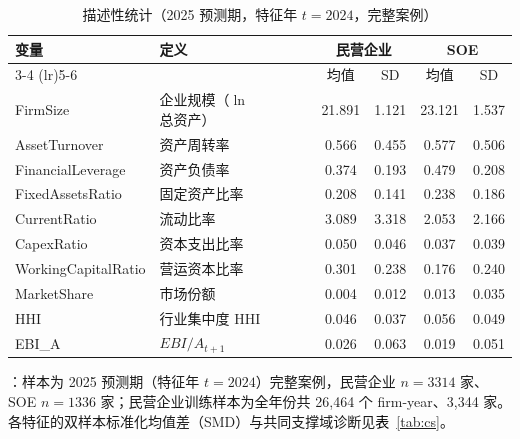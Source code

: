 \begin{table}[t]
\centering
\caption{描述性统计（2025 预测期，特征年 $t=2024$，完整案例）}
\label{tab:descriptives}
\small
\begin{tabular}{llcccc}
\toprule
变量 & 定义 & \multicolumn{2}{c}{民营企业} & \multicolumn{2}{c}{SOE} \\
\cmidrule(lr){3-4} \cmidrule(lr){5-6}
& & 均值 & SD & 均值 & SD \\
\midrule
FirmSize & 企业规模（$\ln$ 总资产） & 21.891 & 1.121 & 23.121 & 1.537 \\
AssetTurnover & 资产周转率 & 0.566 & 0.455 & 0.577 & 0.506 \\
FinancialLeverage & 资产负债率 & 0.374 & 0.193 & 0.479 & 0.208 \\
FixedAssetsRatio & 固定资产比率 & 0.208 & 0.141 & 0.238 & 0.186 \\
CurrentRatio & 流动比率 & 3.089 & 3.318 & 2.053 & 2.166 \\
CapexRatio & 资本支出比率 & 0.050 & 0.046 & 0.037 & 0.039 \\
WorkingCapitalRatio & 营运资本比率 & 0.301 & 0.238 & 0.176 & 0.240 \\
MarketShare & 市场份额 & 0.004 & 0.012 & 0.013 & 0.035 \\
HHI & 行业集中度 HHI & 0.046 & 0.037 & 0.056 & 0.049 \\
EBI_A & $EBI/A_{t+1}$ & 0.026 & 0.063 & 0.019 & 0.051 \\
\bottomrule
\end{tabular}

\begin{tablenotes}\footnotesize{}：样本为 2025 预测期（特征年 $t=2024$）完整案例，民营企业 $n=3314$ 家、SOE $n=1336$ 家；民营企业训练样本为全年份共 26,464 个 firm-year、3,344 家。各特征的双样本标准化均值差（SMD）与共同支撑域诊断见\textcolor{black}{表~\ref{tab:cs}}。\end{tablenotes}
\end{table}
